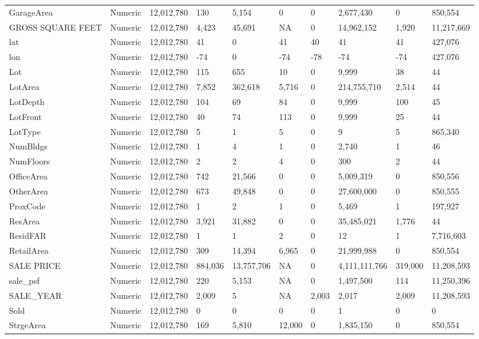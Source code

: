 \documentclass[12pt,]{article}
\begin{document}
\begin{table}
{\begin{tabular}[t]{llllllllll}
GarageArea & Numeric & 12,012,780 & 130 & 5,154 & 0 & 0 & 2,677,430 & 0 & 850,554\\
GROSS SQUARE FEET & Numeric & 12,012,780 & 4,423 & 45,691 & NA & 0 & 14,962,152 & 1,920 & 11,217,669\\
\addlinespace
lat & Numeric & 12,012,780 & 41 & 0 & 41 & 40 & 41 & 41 & 427,076\\
lon & Numeric & 12,012,780 & -74 & 0 & -74 & -78 & -74 & -74 & 427,076\\
Lot & Numeric & 12,012,780 & 115 & 655 & 10 & 0 & 9,999 & 38 & 44\\
LotArea & Numeric & 12,012,780 & 7,852 & 362,618 & 5,716 & 0 & 214,755,710 & 2,514 & 44\\
LotDepth & Numeric & 12,012,780 & 104 & 69 & 84 & 0 & 9,999 & 100 & 45\\
\addlinespace
LotFront & Numeric & 12,012,780 & 40 & 74 & 113 & 0 & 9,999 & 25 & 44\\
LotType & Numeric & 12,012,780 & 5 & 1 & 5 & 0 & 9 & 5 & 865,340\\
NumBldgs & Numeric & 12,012,780 & 1 & 4 & 1 & 0 & 2,740 & 1 & 46\\
NumFloors & Numeric & 12,012,780 & 2 & 2 & 4 & 0 & 300 & 2 & 44\\
OfficeArea & Numeric & 12,012,780 & 742 & 21,566 & 0 & 0 & 5,009,319 & 0 & 850,556\\
\addlinespace
OtherArea & Numeric & 12,012,780 & 673 & 49,848 & 0 & 0 & 27,600,000 & 0 & 850,555\\
ProxCode & Numeric & 12,012,780 & 1 & 2 & 1 & 0 & 5,469 & 1 & 197,927\\
ResArea & Numeric & 12,012,780 & 3,921 & 31,882 & 0 & 0 & 35,485,021 & 1,776 & 44\\
ResidFAR & Numeric & 12,012,780 & 1 & 1 & 2 & 0 & 12 & 1 & 7,716,603\\
RetailArea & Numeric & 12,012,780 & 309 & 14,394 & 6,965 & 0 & 21,999,988 & 0 & 850,554\\
\addlinespace
SALE PRICE & Numeric & 12,012,780 & 884,036 & 13,757,706 & NA & 0 & 4,111,111,766 & 319,000 & 11,208,593\\
sale\_psf & Numeric & 12,012,780 & 220 & 5,153 & NA & 0 & 1,497,500 & 114 & 11,250,396\\
SALE\_YEAR & Numeric & 12,012,780 & 2,009 & 5 & NA & 2,003 & 2,017 & 2,009 & 11,208,593\\
Sold & Numeric & 12,012,780 & 0 & 0 & 0 & 0 & 1 & 0 & 0\\
StrgeArea & Numeric & 12,012,780 & 169 & 5,810 & 12,000 & 0 & 1,835,150 & 0 & 850,554\\

\end{tabular}}
\end{table}
\end{document}
